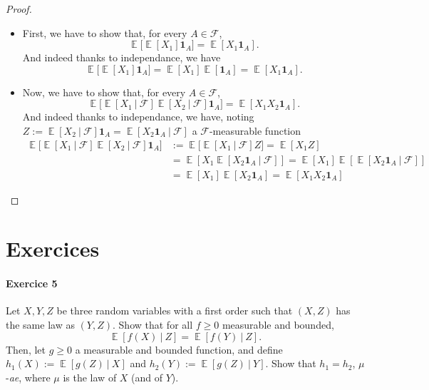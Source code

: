\documentclass[10pt,a4paper]{article}
\theoremstyle{definition}
\numberwithin{equation}{section}
\DeclareMathOperator{\E}{\mathbb{E}}
\begin{document}
\begin{proof}
\begin{itemize}
\item[$\bullet$] First, we have to show that, for every $A\in\mathcal{F}$, 
$$\E\big[\E[X_1]\mathbf{1}_A\big]=\E[X_1\mathbf{1}_A].$$
And indeed thanks to independance, we have
$$\E\big[\E[X_1]\mathbf{1}_A\big]=\E[X_1]\E[\mathbf{1}_A]=\E[X_1\mathbf{1}_A].$$
\item[$\bullet$] Now, we have to show that, for every $A\in\mathcal{F}$, 
$$ \E\big[\E[X_1~|~\mathcal{F}]\E[X_2~|~\mathcal{F}]\mathbf{1}_A\big]=\E[X_1 X_2\mathbf{1}_A].$$
And indeed thanks to independance, we have, noting $Z:=\E[X_2~|~\mathcal{F}]\mathbf{1}_A=\E[X_2\mathbf{1}_A~|~\mathcal{F}]$ a $\mathcal{F}$-measurable function
\begin{align*} 
\E\big[\E[X_1~|~\mathcal{F}]\E[X_2~|~\mathcal{F}]\mathbf{1}_A\big] &:= \E\big[\E[X_1~|~\mathcal{F}]Z\big] = \E[X_1 Z]\\
&= \E[X_1 \E[X_2\mathbf{1}_A~|~\mathcal{F}]] = \E[X_1]\E[\E[X_2\mathbf{1}_A~|~\mathcal{F}]]\\
&= \E[X_1]\E[X_2\mathbf{1}_A] = \E[X_1 X_2\mathbf{1}_A]
\end{align*}
\end{itemize}
\end{proof}



\section{Exercices}

\paragraph{Exercice 5}
Let $X,Y,Z$ be three random variables with a first order such that $(X,Z)$ has the same law as $(Y,Z)$. Show that for all $f\geq 0$ measurable and bounded,
$$\E[f(X)~|~Z] = \E[f(Y)~|~Z].$$ 
Then, let $g\geq 0$ a measurable and bounded function, and define $h_1(X):=\E[g(Z)~|~X]$ and $h_2(Y):=\E[g(Z)~|~Y]$. Show that $h_1=h_2$, $\mu$-\textit{ae}, where $\mu$ is the law of $X$ (and of $Y$).
\end{document}
